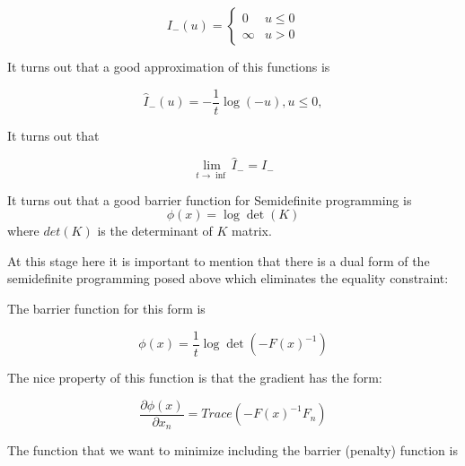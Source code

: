 \documentclass[12pt,letterpaper,doublespaced,ETD,dvips,proposal]{gtthesis}
\begin{document}
\begin{Body}
\begin{equation}
I_{-}(u)= \left\{
               \begin{array}{cc}
                 0    & u\leq 0 \\
                 \infty & u>0
                \end{array}
          \right.
\end{equation}


It turns out that a good approximation of this functions is

\begin{equation}
\hat{I}_{-}(u) = -\frac{1}{t}\log(-u), u\leq 0,
\end{equation}

It turns out that

\begin{equation}
\lim_{t\rightarrow \inf} \hat{I}_{-} = I_{-}
\end{equation}

It turns out that a good barrier function for Semidefinite
programming is
\begin{equation}
\phi(x)=\log \det(K)
\end{equation}
where $det(K)$ is the determinant of $K$ matrix.

At this stage here it is important to mention that there is a dual
form of the semidefinite programming posed above which eliminates
the equality constraint:

\vspace{1cm}


\vspace{1cm}

The barrier function for this form is

\begin{equation}
\phi(x)=\frac{1}{t}\log\det(-F(x)^{-1})
\end{equation}

The nice property of this function is that the gradient has the form:

\begin{equation}
\frac{\partial\phi(x)}{\partial x_{n}} = Trace(-F(x)^{-1}F_n)
\end{equation}

The function that we want to minimize including the barrier
(penalty) function is


\end{Body}
\end{document}
